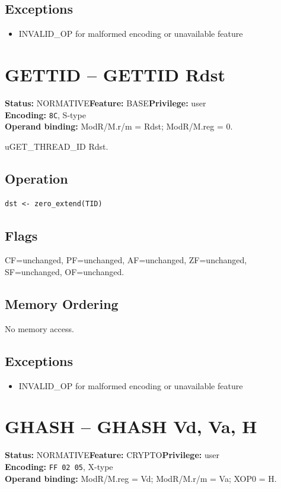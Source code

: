 \documentclass[10pt]{article}
\begin{document}
\subsection*{Exceptions}
\begin{itemize}
\item INVALID\_OP for malformed encoding or unavailable feature
\end{itemize}
\clearpage

\section{GETTID -- GETTID Rdst}
\textbf{Status:} NORMATIVE\quad \textbf{Feature:} BASE\quad \textbf{Privilege:} user\\
\textbf{Encoding:} \texttt{8C}, S-type\\
\textbf{Operand binding:} ModR/M.r/m = Rdst; ModR/M.reg = 0.

uGET\_THREAD\_ID Rdst.

\subsection*{Operation}
\begin{lstlisting}
dst <- zero_extend(TID)
\end{lstlisting}
\subsection*{Flags}
CF=unchanged, PF=unchanged, AF=unchanged, ZF=unchanged, SF=unchanged, OF=unchanged.
\subsection*{Memory Ordering}
No memory access.
\subsection*{Exceptions}
\begin{itemize}
\item INVALID\_OP for malformed encoding or unavailable feature
\end{itemize}
\clearpage

\section{GHASH -- GHASH Vd, Va, H}
\textbf{Status:} NORMATIVE\quad \textbf{Feature:} CRYPTO\quad \textbf{Privilege:} user\\
\textbf{Encoding:} \texttt{FF 02 05}, X-type\\
\textbf{Operand binding:} ModR/M.reg = Vd; ModR/M.r/m = Va; XOP0 = H.
\end{document}

